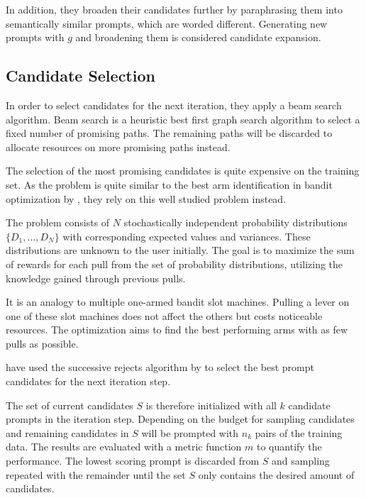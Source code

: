 In addition, they broaden their candidates further by paraphrasing them into semantically similar prompts, which are worded different. Generating new prompts with $g$ and broadening them is considered candidate expansion.

\subsection{Candidate Selection}
In order to select candidates for the next iteration, they apply a beam search algorithm. Beam search is a heuristic best first graph search algorithm to select a fixed number of promising paths. The remaining paths will be discarded to allocate resources on more promising paths instead. \cite{BeamSearch}

The selection of the most promising candidates is quite expensive on the training set. As the problem is quite similar to the best arm identification in bandit optimization by , they rely on this well studied problem instead.

The problem consists of $N$ stochastically independent probability distributions $\{ D_1, \dots, D_N\}$ with corresponding expected values and variances. These distributions are unknown to the user initially. The goal is to maximize the sum of rewards for each pull from the set of probability distributions, utilizing the knowledge gained through previous pulls. \cite{kuleshov2014AlgorithmsMultiarmeda}

It is an analogy to multiple one-armed bandit slot machines. Pulling a lever on one of these slot machines does not affect the others but costs noticeable resources. The optimization aims to find the best performing arms with as few pulls as possible. 

\citeauthor{pryzant2023AutomaticPrompt} have used the successive rejects algorithm by  to select the best prompt candidates for the next iteration step.

The set of current candidates $S$ is therefore initialized with all $k$ candidate prompts in the iteration step. Depending on the budget for sampling candidates and remaining candidates in $S$ will be prompted with $n_k$ pairs of the training data. The results are evaluated with a metric function $m$ to quantify the performance. The lowest scoring prompt is discarded from $S$ and sampling repeated with the remainder until the set $S$ only contains the desired amount of candidates.

